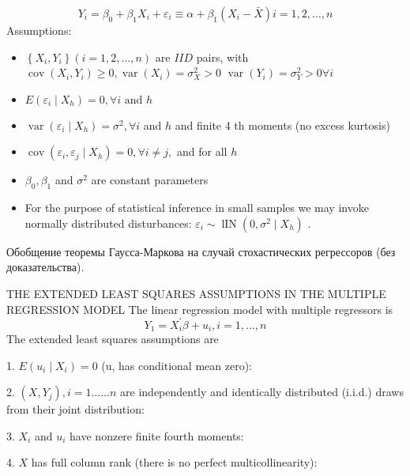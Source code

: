 \documentclass[a4paper,8pt]{article} %
\begin{document}
$$
Y_{i}=\beta_{0}+\beta_{1} X_{i}+\varepsilon_{i} \equiv \alpha+\beta_{1}\left(X_{i}-\bar{X}\right) i=1,2, \ldots, n
$$
Assumptions:
\begin{itemize}
	\item  $\left\{X_{i}, Y_{i}\right\}(i=1,2, \ldots, n)$ are $IID$ pairs, with $\operatorname{cov}\left(X_{i}, Y_{i}\right) \geq 0, \operatorname{var}\left(X_{i}\right)=\sigma_{X}^{2}>0$
$\operatorname{var}\left(Y_{i}\right)=\sigma_{Y}^{2}>0 \forall i$
\item  $  E\left(\varepsilon_{i} \mid X_{h}\right)=0, \forall i \text { and } h $
\item  $\operatorname{var}\left(\varepsilon_{i} \mid X_{h}\right)=\sigma^{2}, \forall i$ and $h$ and finite 4 th moments (no excess kurtosis)
\item  $\operatorname{cov}\left(\varepsilon_{i}, \varepsilon_{j} \mid X_{h}\right)=0, \forall i \neq j,$ and for all $h$
\item  $\beta_{0}, \beta_{1}$ and $\sigma^{2}$ are constant parameters
\item For the purpose of statistical inference in small samples we may invoke normally distributed disturbances:
$ \varepsilon_{i} \sim \operatorname{lIN}\left(0, \sigma^{2} \mid X_{h}\right) \text { . }
$
\end{itemize}





Обобщение теоремы Гаусса-Маркова  на  случай  стохастических  регрессоров  (без  доказательства).  

THE EXTENDED LEAST SQUARES ASSUMPTIONS IN THE MULTIPLE REGRESSION MODEL
The linear regression model with multiple regressors is
$$
Y_{1}=X_{i}^{\prime} \beta+u_{i}, i=1, \ldots, n
$$
The extended least squares assumptions are

1. $E\left(u_{i} \mid X_{i}\right)=0$ (u, has conditional mean zero):

2. $\left(X, Y_{j}\right), i=1 \ldots \ldots n$ are independently and identically distributed (i.i.d.) draws from their joint distribution:

3. $X_{i}$ and $u_{i}$ have nonzere finite fourth moments:

4. $X$ has full column rank (there is no perfect multicollinearity):
\end{document}
